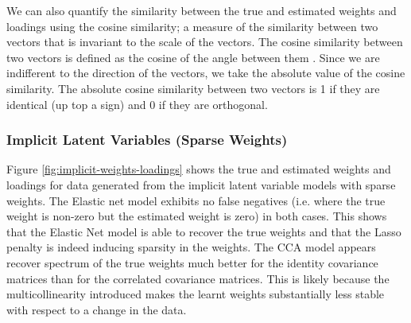 We can also quantify the similarity between the true and estimated weights and \gls{loadings} using the cosine similarity; a measure of the similarity between two vectors that is invariant to the scale of the vectors.
The cosine similarity between two vectors is defined as the cosine of the angle between them \citep{luo2018cosine}.
Since we are indifferent to the direction of the vectors, we take the absolute value of the cosine similarity.
The absolute cosine similarity between two vectors is 1 if they are identical (up top a sign) and 0 if they are orthogonal.

\subsubsection{Implicit Latent Variables (Sparse Weights)}

Figure \ref{fig:implicit-weights-loadings} shows the true and estimated weights and \gls{loadings} for data generated from the implicit latent variable models with sparse weights.
The Elastic net model exhibits no false negatives (i.e. where the true weight is non-zero but the estimated weight is zero) in both cases.
This shows that the Elastic Net model is able to recover the true weights and that the Lasso penalty is indeed inducing sparsity in the weights.
The CCA model appears recover spectrum of the true weights much better for the identity covariance matrices than for the correlated covariance matrices.
This is likely because the multicollinearity introduced makes the learnt weights substantially less stable with respect to a change in the data.

